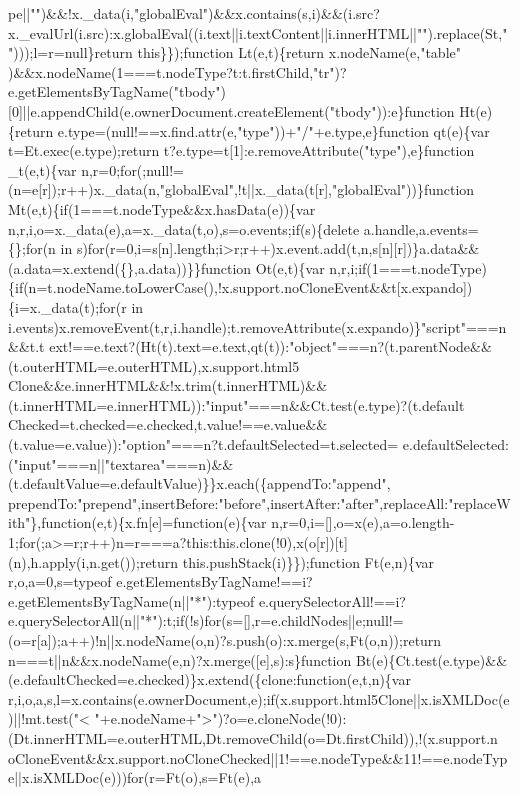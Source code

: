 \begin{DoxyCode}
{      pe||"")&&!x.\_data(i,"globalEval")&&x.contains(s,i)&&(i.src?x.\_evalUrl(i.src):x.globalEval((i.text||i.textContent||i.innerHTML||"").replace(St,"")));l=r=null\}return this\}\});function Lt(e,t)\{return
       x.nodeName(e,"table"
      )&&x.nodeName(1===t.nodeType?t:t.firstChild,"tr")?e.getElementsByTagName("tbody")[0]||e.appendChild(e.ownerDocument.createElement("tbody")):e\}function Ht(e)\{return
       e.type=(null!==x.find.attr(e,"type"))+"/"+e.type,e\}function qt(e)\{var t=Et.exec(e.type);return t?e.type=t[1]:e.removeAttribute("type"),e\}function \_t(e,t)\{var
       n,r=0;for(;null!=(n=e[r]);r++)x.\_data(n,"globalEval",!t||x.\_data(t[r],"globalEval"))\}function
       Mt(e,t)\{if(1===t.nodeType&&x.hasData(e))\{var n,r,i,o=x.\_data(e),a=x.\_data(t,o),s=o.events;if(s)\{delete
       a.handle,a.events=\{\};for(n in
       s)for(r=0,i=s[n].length;i>r;r++)x.event.add(t,n,s[n][r])\}a.data&&(a.data=x.extend(\{\},a.data))\}\}function Ot(e,t)\{var
       n,r,i;if(1===t.nodeType)\{if(n=t.nodeName.toLowerCase(),!x.support.noCloneEvent&&t[x.expando])\{i=x.\_data(t);for(r in
       i.events)x.removeEvent(t,r,i.handle);t.removeAttribute(x.expando)\}"script"===n&&t.t
      ext!==e.text?(Ht(t).text=e.text,qt(t)):"object"===n?(t.parentNode&&(t.outerHTML=e.outerHTML),x.support.html5
      Clone&&e.innerHTML&&!x.trim(t.innerHTML)&&(t.innerHTML=e.innerHTML)):"input"===n&&Ct.test(e.type)?(t.default
      Checked=t.checked=e.checked,t.value!==e.value&&(t.value=e.value)):"option"===n?t.defaultSelected=t.selected=
      e.defaultSelected:("input"===n||"textarea"===n)&&(t.defaultValue=e.defaultValue)\}\}x.each(\{appendTo:"append",
      prependTo:"prepend",insertBefore:"before",insertAfter:"after",replaceAll:"replaceWith"\},function(e,t)\{x.fn[e]=function(e)\{var
       n,r=0,i=[],o=x(e),a=o.length-1;for(;a>=r;r++)n=r===a?this:this.clone(!0),x(o[r])[t](n),h.apply(i,n.get());return this.pushStack(i)\}\});function Ft(e,n)\{var r,o,a=0,s=typeof
       e.getElementsByTagName!==i?e.getElementsByTagName(n||"*"):typeof
       e.querySelectorAll!==i?e.querySelectorAll(n||"*"):t;if(!s)for(s=[],r=e.childNodes||e;null!=(o=r[a]);a++)!n||x.nodeName(o,n)?s.push(o):x.merge(s,Ft(o,n));return
       n===t||n&&x.nodeName(e,n)?x.merge([e],s):s\}function
       Bt(e)\{Ct.test(e.type)&&(e.defaultChecked=e.checked)\}x.extend(\{clone:function(e,t,n)\{var
       r,i,o,a,s,l=x.contains(e.ownerDocument,e);if(x.support.html5Clone||x.isXMLDoc(e)||!mt.test("<
      "+e.nodeName+">")?o=e.cloneNode(!0):(Dt.innerHTML=e.outerHTML,Dt.removeChild(o=Dt.firstChild)),!(x.support.n
      oCloneEvent&&x.support.noCloneChecked||1!==e.nodeType&&11!==e.nodeType||x.isXMLDoc(e)))for(r=Ft(o),s=Ft(e),a
}
\end{DoxyCode}
